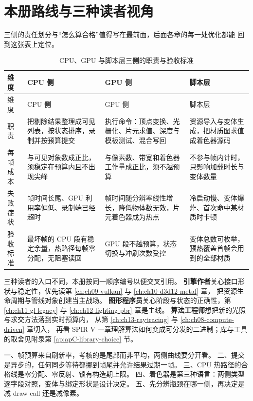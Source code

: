 \documentclass[12pt,a4paper,fontset=fandol]{ctexbook}
\newcommand{\Lang}[1]{\textsf{#1}}
\newcommand{\DomCPU}{\Lang{CPU}}
\newcommand{\DomGPU}{\Lang{GPU}}
\newcommand{\SPIV}{\Lang{SPIR-V}}
\begin{document}
\section{本册路线与三种读者视角}

三侧的责任划分与``怎么算合格''值得写在最前面，后面各章的每一处优化都能
回到这张表上定位。

\begin{longtable}{>{\raggedright\arraybackslash}p{}
                  >{\raggedright\arraybackslash}p{}
                  >{\raggedright\arraybackslash}p{}
                  >{\raggedright\arraybackslash}p{}}
\caption{\DomCPU{}、\DomGPU{} 与脚本层三侧的职责与验收标准}
\label{tab:ch01-three-domains} \\
\toprule
维度 & \DomCPU{} 侧 & \DomGPU{} 侧 & 脚本层 \\
\midrule
\endfirsthead
\toprule
维度 & \DomCPU{} 侧 & \DomGPU{} 侧 & 脚本层 \\
\midrule
\endhead
\midrule
\endfoot
\bottomrule
\endlastfoot
职责 & 把剔除结果整理成可见列表，按状态排序，录制并按预算提交 &
执行命令：顶点变换、光栅化、片元求值、深度与模板测试、混合写回 &
资源导入与变体生成，把材质图求值成着色器源码 \\
每帧成本 & 与可见对象数成正比，须稳定在预算内且不出现尖峰 &
与像素数、带宽和着色器工作量成正比，须不越预算 &
不参与帧内计时，只影响加载时长与变体数量 \\
失败症状 & 帧时间长尾、\DomGPU{} 利用率偏低、录制端已经超时 &
帧时间随分辨率线性增长，降低物体数无效，片元着色器成为热点 &
冷启动慢、变体爆炸、首次命中某材质时卡顿 \\
验收标准 & 最坏帧的 \DomCPU{} 段有稳定余量，热路径每帧零分配，无阻塞读回 &
\DomGPU{} 段不越预算，状态切换与冲刷次数受控 &
变体总数可枚举，预热覆盖首帧会用到的全部材质 \\
\end{longtable}

三种读者的入口不同，本册按同一顺序编号以便交叉引用。
\textbf{引擎作者}关心接口形状与稳定性，优先读第
\ref{ch:ch09-vulkan} 与 \ref{ch:ch10-d3d12-metal} 章，
把资源生命周期与管线对象创建当主战场。
\textbf{图形程序员}关心阶段与状态的正确性，第
\ref{ch:ch11-gl-legacy} 与 \ref{ch:ch12-lighting-pbr} 章是主线。
\textbf{算法工程师}想把新的光照与求交方法落到实时预算内，
从第 \ref{ch:ch13-raytracing} 与 \ref{ch:ch08-compute-driven} 章切入，
再看 \SPIV{} 一章理解算法如何变成可分发的二进制；库与工具的取舍见附录第
\ref{ap:apC-library-choice} 节。

\begin{guideline}[title={本章的五条判据}]
一、帧预算来自刷新率，考核的是尾部而非平均，两侧曲线要分开看。
二、提交是异步的，任何同步等待都挪到帧尾并允许结果过期一帧。
三、\DomCPU{} 热路径的合格线是零分配、零反射、锁有构造期上限。
四、着色器是第三种语言：两侧类型逐字段对照，变体与绑定形状是设计决定。
五、先分辨瓶颈在哪一侧，再决定是减 draw call 还是减像素。
\end{guideline}
\end{document}
